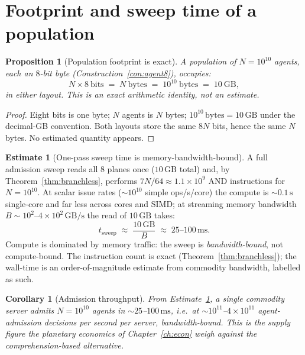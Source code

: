 \documentclass[11pt,oneside]{book}
\theoremstyle{definition}
\newtheorem{estimate}{Estimate}[chapter]
\theoremstyle{plain}
\newtheorem{proposition}[theorem]{Proposition}
\newtheorem{corollary}[theorem]{Corollary}
\theoremstyle{remark}
\newcommand{\Bw}{B}                            %
\begin{document}
\section{Footprint and sweep time of a population}

\begin{proposition}[Population footprint is exact]\label{prop:footprint}
A population of $N=10^{10}$ agents, each an $8$-bit byte (Construction~\ref{con:agent8}), occupies:
\[
N\times 8\ \text{bits}\;=\;N\ \text{bytes}\;=\;10^{10}\ \text{bytes}\;=\;10\ \mathrm{GB},
\]
in either layout. %
This is an exact arithmetic identity, not an estimate. %
\end{proposition}

\begin{proof}
Eight bits is one byte; $N$ agents is $N$ bytes; $10^{10}\,\text{bytes}=10\,\mathrm{GB}$ under the decimal-GB convention. %
Both layouts store the same $8N$ bits, hence the same $N$ bytes. %
No estimated quantity appears. %
\end{proof}

\begin{estimate}[One-pass sweep time is memory-bandwidth-bound]\label{est:sweep}
A full admission sweep reads all $8$ planes once ($10\,\mathrm{GB}$ total) and, by Theorem~\ref{thm:branchless}, performs $7N/64\approx 1.1\times 10^{9}$ AND instructions for $N=10^{10}$. %
At scalar issue rates ($\sim\!10^{10}$ simple ops/s/core) the compute is $\sim\!0.1\,\mathrm{s}$ single-core and far less across cores and SIMD; at streaming memory bandwidth $\Bw\sim 10^{2}$--$4\times 10^{2}\,\mathrm{GB/s}$ the read of $10\,\mathrm{GB}$ takes:
\[
t_{\text{sweep}}\;\approx\;\frac{10\,\mathrm{GB}}{\Bw}\;\approx\;25\text{--}100\,\mathrm{ms}.
\]
Compute is dominated by memory traffic: the sweep is \emph{bandwidth-bound}, not compute-bound. %
The instruction count is exact (Theorem~\ref{thm:branchless}); the wall-time is an order-of-magnitude estimate from commodity bandwidth, labelled as such. %
\end{estimate}

\begin{corollary}[Admission throughput]\label{cor:throughput}
From Estimate~\ref{est:sweep}, a single commodity server admits $N=10^{10}$ agents in $\sim\!25$--$100\,\mathrm{ms}$, i.e.\ at $\sim\!10^{11}$--$4\times 10^{11}$ agent-admission decisions per second per server, bandwidth-bound. %
This is the supply figure the planetary economics of Chapter~\ref{ch:econ} weigh against the comprehension-based alternative. %
\end{corollary}
\end{document}
